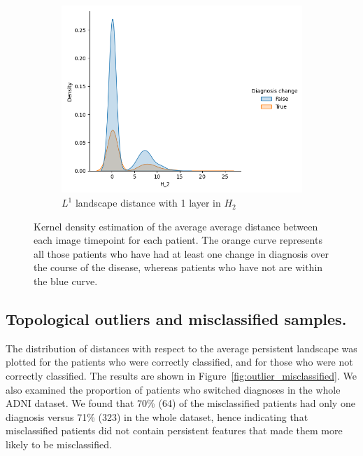 \documentclass{article}
\begin{document}
\begin{figure}[htb]
\begin{subfigure}{0.32\textwidth}
    \includegraphics[width=\textwidth]{figures/temporal_evolution/landscape_H_2_dist_diag_change.png}
    \caption{$L^{1}$ landscape distance with 1 layer in $H_2$}
  \end{subfigure}
  \caption{Kernel density estimation of the average average distance between each image timepoint
    for each patient. The orange curve represents all those patients who have had at least one
    change in diagnosis over the course of the disease, whereas patients who have not are within the
    blue curve.}
  \label{fig:kde_intra_patient}
\end{figure}

\subsection{Topological outliers and misclassified samples.}

The distribution of distances with respect to the average persistent landscape was plotted for the
patients who were correctly classified, and for those who were not correctly classified. The results
are shown in Figure~\ref{fig:outlier_misclassified}. We also examined the proportion of patients who
switched diagnoses in the whole ADNI dataset. We found that 70\% (64) of the misclassified patients
had only one diagnosis versus 71\% (323) in the whole dataset, hence indicating that misclassified
patients did not contain persistent features that made them more likely to be misclassified.
\end{document}
